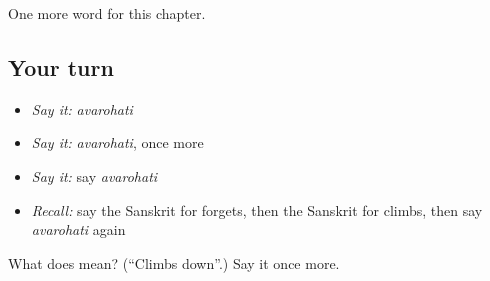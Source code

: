 \begin{grammarlens}[title={What you've built}]
One more word for this chapter.
\end{grammarlens}

\subsection*{Your turn}
\begin{itemize}
\raggedright
  \item \emph{Say it:} \emph{avarohati}
  \item \emph{Say it:} \emph{avarohati}, once more
  \item \emph{Say it:} say \emph{avarohati}
  \item \emph{Recall:} say the Sanskrit for forgets, then the Sanskrit for climbs, then say \emph{avarohati} again
\end{itemize}

\begin{tcolorbox}[breakable,colback=teal!4,colframe=teal!35!black,title={Before you move on}]
What does  mean? (\textquotedblleft{}Climbs down\textquotedblright{}.) Say it once more.
\end{tcolorbox}
